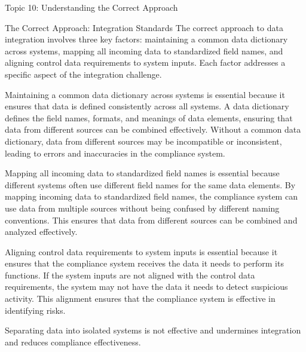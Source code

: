\documentclass[5pt]{beamer}
\begin{document}
	\begin{frame}{Topic 10: Understanding the Correct Approach}
		\begin{block}{\tiny The Correct Approach: Integration Standards}
			\tiny The correct approach to data integration involves three key factors: maintaining a common data dictionary across systems, mapping all incoming data to standardized field names, and aligning control data requirements to system inputs. Each factor addresses a specific aspect of the integration challenge.
			
			Maintaining a common data dictionary across systems is essential because it ensures that data is defined consistently across all systems. A data dictionary defines the field names, formats, and meanings of data elements, ensuring that data from different sources can be combined effectively. Without a common data dictionary, data from different sources may be incompatible or inconsistent, leading to errors and inaccuracies in the compliance system.
			
			Mapping all incoming data to standardized field names is essential because different systems often use different field names for the same data elements. By mapping incoming data to standardized field names, the compliance system can use data from multiple sources without being confused by different naming conventions. This ensures that data from different sources can be combined and analyzed effectively.
			
			Aligning control data requirements to system inputs is essential because it ensures that the compliance system receives the data it needs to perform its functions. If the system inputs are not aligned with the control data requirements, the system may not have the data it needs to detect suspicious activity. This alignment ensures that the compliance system is effective in identifying risks.
			
			Separating data into isolated systems is not effective and undermines integration and reduces compliance effectiveness.
		\end{block}
	\end{frame}
	
\end{document}
